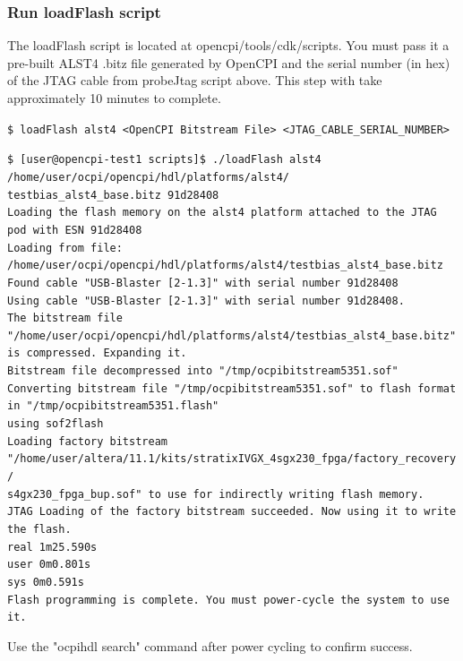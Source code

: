\documentclass{article}
\newcommand{\shellcmd}[1]{\texttt{\$ #1\\}}
\newcommand{\terminaloutput}[1]{\texttt{#1}}
\begin{document}
\subsubsection*{Run loadFlash script}
The loadFlash script is located at opencpi/tools/cdk/scripts. You must pass it a pre-built ALST4 .bitz file generated by OpenCPI and the serial number (in hex) of the JTAG cable from probeJtag script above. This step with take approximately 10 minutes to complete.\par\bigskip
{}\par
\noindent\shellcmd{loadFlash alst4 <OpenCPI Bitstream File> <JTAG\_CABLE\_SERIAL\_NUMBER> }\par\smallskip
{}\par
\noindent\shellcmd{[user@opencpi-test1 scripts]\$ ./loadFlash alst4 /home/user/ocpi/opencpi/hdl/platforms/alst4\slash \\testbias\_alst4\_base.bitz 91d28408}
\terminaloutput{Loading the flash memory on the alst4 platform attached to the JTAG pod with ESN 91d28408\\
Loading from file: /home/user/ocpi/opencpi/hdl/platforms/alst4/testbias\_alst4\_base.bitz\\
Found cable "USB-Blaster [2-1.3]" with serial number 91d28408\\
Using cable "USB-Blaster [2-1.3]" with serial number 91d28408.\\
The bitstream file "/home/user/ocpi/opencpi/hdl/platforms/alst4/testbias\_alst4\_base.bitz" is compressed. Expanding it.\\
Bitstream file decompressed into "/tmp/ocpibitstream5351.sof"\\
Converting bitstream file "/tmp/ocpibitstream5351.sof" to flash format in "/tmp/ocpibitstream5351.flash" \\using sof2flash\\
Loading factory bitstream "/home/user/altera/11.1/kits/stratixIVGX\_4sgx230\_fpga/factory\_recovery\slash \\s4gx230\_fpga\_bup.sof" to use for indirectly writing flash memory.\\
JTAG Loading of the factory bitstream succeeded. Now using it to write the flash.\\
real	1m25.590s\\
user	0m0.801s\\
sys	0m0.591s\\
Flash programming is complete. You must power-cycle the system to use it.}\par\bigskip
\noindent Use the "ocpihdl search" command after power cycling to confirm success.\par
\end{document}
